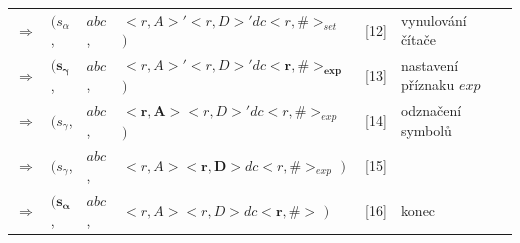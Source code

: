 \begin{Example}
\begin{tabular}{llllc|l}
$\Rightarrow$   & $( s_{\alpha}$,  & $abc$, & $<r,A>' <r,D>' d c <r, \#>_{set}$  $)$  & [12] \quad&\quad  vynulování čítače\\
$\Rightarrow$   & $( \mathbf{s_{\gamma}}$,  & $abc$, & $<r,A>' <r,D>' d c \mathbf{<r, \#>_{exp}}$  $)$  & [13] \quad&\quad  nastavení příznaku $exp$\\
$\Rightarrow$   & $( s_{\gamma}$,  & $abc$, & $\mathbf{<r,A>} <r,D>' d c <r, \#>_{exp}$  $)$  & [14] \quad&\quad  odznačení symbolů\\
$\Rightarrow$   & $( s_{\gamma}$,  & $abc$, & $<r,A> \mathbf{<r,D>} d c <r, \#>_{exp}$  $)$  & [15] \quad&\quad  \\
$\Rightarrow$   & $( \mathbf{s_{\alpha}}$,  & $abc$, & $<r,A> <r,D> d c \mathbf{<r, \#>}$  $)$  & [16] \quad&\quad  konec

\end{tabular}

\setlength{\tabcolsep}{\deftabcolsep}

\end{Example}



